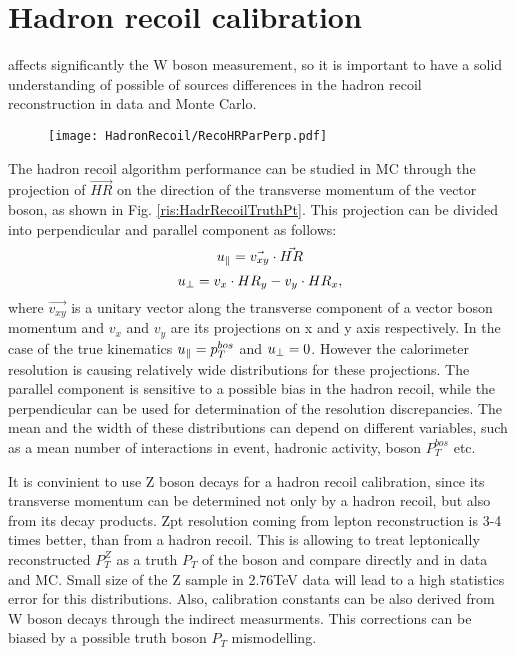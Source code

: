 \chapter{Hadron recoil calibration}\label{sec:HadrCalib}
\etmiss affects significantly the W boson measurement, so it is important to have a solid understanding  of possible of sources differences in the hadron recoil reconstruction in data and Monte Carlo. 

\begin{figure}

\begin{minipage}[h]{0.49\linewidth}
\texttt{[image: HadronRecoil/RecoHRParPerp.pdf]}
\end{minipage}

\end{figure}

The hadron recoil algorithm performance can be studied in MC through the projection of $\vec{HR}$ on the direction of the transverse momentum of the vector boson, as shown in Fig. \ref{ris:HadrRecoilTruthPt}. This projection can be divided into perpendicular \uperp and parallel \upar component as follows:
\begin{equation}
u_{\parallel}=\vec{v_{xy}}\cdot\vec{HR}
\end{equation}
\begin{equation}
u_{\perp}=v_x\cdot HR_y - v_y \cdot HR_x,
\end{equation}
where $\vec{v_{xy}}$ is a unitary vector along the transverse component of a vector boson momentum and $v_x$ and $v_y$ are its projections on x and y axis respectively. In the case of the true kinematics $u_{\parallel}=p_T^{bos}$ and $u_{\perp} = 0$. However the calorimeter resolution is causing relatively wide distributions for these projections. The parallel component \upar is sensitive to a possible bias in the hadron recoil, while the perpendicular \uperp can be used for determination of the resolution discrepancies. The mean and the width of these distributions can depend on different variables, such as a mean number of interactions in event, hadronic activity, boson $P_{T}^{bos}$ etc. 

 
It is convinient to use Z boson decays for a hadron recoil calibration, since its transverse momentum can be determined not only by a hadron recoil, but also from its decay products.  Zpt resolution coming from lepton reconstruction is 3-4 times better, than from a hadron recoil. This is allowing to treat leptonically reconstructed $P_T^{Z}$ as a truth $P_T$ of the boson and compare directly \uperp and \upar in data and MC. Small size of the Z sample in 2.76TeV data will lead to a high statistics error for this distributions. Also, calibration constants can be also derived from W boson decays through the indirect measurments. This corrections can be biased by a possible truth boson $P_T$ mismodelling. 
 
